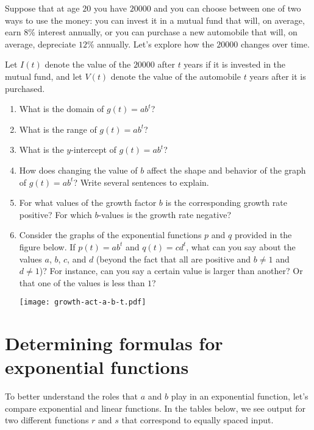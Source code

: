 \documentclass[nooutcomes]{ximera}
\begin{document}
\begin{exploration}
Suppose that at age $20$ you have \textdollar{}$20000$ and you can choose between one of two ways to use the money:  you can invest it in a mutual fund that will, on average, earn $8$\% interest annually, or you can purchase a new automobile that will, on average, depreciate $12$\% annually.  Let's explore how the $20000$ changes over time.%

Let $I(t)$ denote the value of the \textdollar{}$20000$ after $t$ years if it is invested in the mutual fund, and let $V(t)$ denote the value of the automobile $t$ years after it is purchased.

\begin{enumerate}[label=\alph*.]
\item What is the domain of $g(t) = ab^t$?
\item What is the range of $g(t) = ab^t$?
\item What is the $y$-intercept of $g(t) = ab^t$?
\item How does changing the value of $b$ affect the shape and behavior of the graph of $g(t) = ab^t$?  Write several sentences to explain.
\item For what values of the growth factor $b$ is the corresponding growth rate positive?  For which $b$-values is the growth rate negative?
\item Consider the graphs of the exponential functions $p$ and $q$ provided in the figure below.  If $p(t) = ab^t$ and $q(t) = cd^t$, what can you say about the values $a$, $b$, $c$, and $d$ (beyond the fact that all are positive and $b \ne 1$ and $d \ne 1$)?  For instance, can you say a certain value is larger than another?  Or that one of the values is less than $1$?
\begin{image}
\texttt{[image: growth-act-a-b-t.pdf]}
\end{image}
\end{enumerate}
\end{exploration}
%

\section{Determining formulas for exponential functions}

To better understand the roles that $a$ and $b$ play in an exponential function, let's compare exponential and linear functions.  In the tables below, we see output for two different functions $r$ and $s$ that correspond to equally spaced input.
\end{document}
